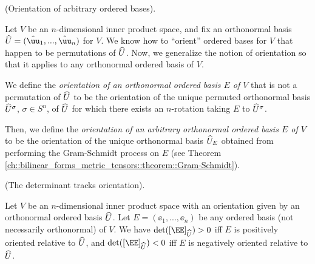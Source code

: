 \begin{defn}
    (Orientation of arbitrary ordered bases).
    
    Let $V$ be an $n$-dimensional inner product space, and fix an orthonormal basis $\hU = (\huu_1, ..., \huu_n)$ for $V$. We know how to ``orient'' ordered bases for $V$ that happen to be permutations of $\widehat{U}$. Now, we generalize the notion of orientation so that it applies to any orthonormal ordered basis of $V$.
    
    We define the \textit{orientation of an orthonormal ordered basis $E$ of $V$} that is not a permutation of $\widehat{U}$ to be the orientation of the unique permuted orthonormal basis $\widehat{U}^\sigma$, $\sigma \in S^n$, of $\widehat{U}$ for which there exists an $n$-rotation taking $E$ to $\widehat{U}^\sigma$.
    
    Then, we define the \textit{orientation of an arbitrary orthonormal ordered basis $E$ of $V$} to be the orientation of the unique orthonormal basis $\widehat{U}_E$ obtained from performing the Gram-Schmidt process on $E$ (see Theorem \ref{ch::bilinear_forms_metric_tensors::theorem::Gram-Schmidt}).
\end{defn}

\begin{theorem}
\label{ch::exterior_pwrs::thm::det_tracks_orientation}
    (The determinant tracks orientation). 
    
    Let $V$ be an $n$-dimensional inner product space with an orientation given by an orthonormal ordered basis $\widehat{U}$. Let $E = (\ee_1, ..., \ee_n)$ be any ordered basis (not necessarily orthonormal) of $V$. We have $\det([\EE]_{\hU}) > 0$ iff $E$ is positively oriented relative to $\widehat{U}$, and $\det([\EE]_{\hU}) < 0$ iff $E$ is negatively oriented relative to $\widehat{U}$.
\end{theorem}

